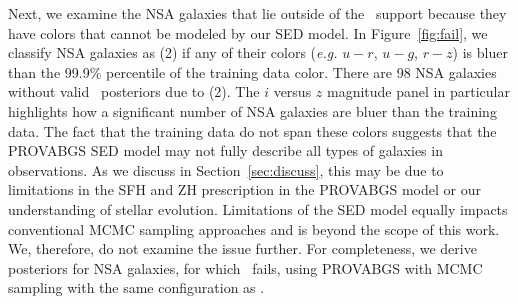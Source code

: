 Next, we examine the NSA galaxies that lie outside of the \sedflow~support
because they have colors that cannot be modeled by our SED model. 
In Figure~\ref{fig:fail}, we classify NSA galaxies as (2) if any of their
colors (\emph{e.g.} $u-r$, $u-g$, $r-z$) is bluer than the 99.9\% percentile of
the training data color. 
There are 98 NSA galaxies without valid \sedflow~posteriors due to (2).
The $i$ versus $z$ magnitude panel in particular highlights how a significant
number of NSA galaxies are bluer than the training data. 
The fact that the training data do not span these colors suggests that the
PROVABGS SED model may not fully describe all types of galaxies in observations. 
As we discuss in Section~\ref{sec:discuss}, this may be due to limitations in
the SFH and ZH prescription in the PROVABGS model or our understanding of
stellar evolution. 
Limitations of the SED model equally impacts conventional MCMC sampling
approaches and is beyond the scope of this work. 
We, therefore, do not examine the issue further. 
For completeness, we derive posteriors for NSA galaxies, for which
\sedflow~fails, using PROVABGS with MCMC sampling with the same configuration
as \cite{hahn2022}. 

